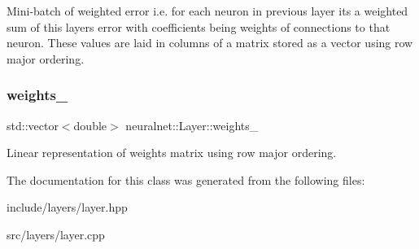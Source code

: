 Mini-\/batch of weighted error i.\+e. for each neuron in previous layer it\textquotesingle{}s a weighted sum of this layer\textquotesingle{}s error with coefficients being weights of connections to that neuron. These values are laid in columns of a matrix stored as a vector using row major ordering. \mbox{\label{classneuralnet_1_1Layer_a6d62e504bac81323fb080a06b2f99341}} 
\subsubsection{\texorpdfstring{weights\+\_\+}{weights\_}}
{\footnotesize\ttfamily std\+::vector$<$double$>$ neuralnet\+::\+Layer\+::weights\+\_\+\hspace{0.3cm}{\ttfamily [protected]}}

Linear representation of weights matrix using row major ordering. 

The documentation for this class was generated from the following files\+:\begin{DoxyCompactItemize}
\item 
include/layers/layer.\+hpp\item 
src/layers/layer.\+cpp\end{DoxyCompactItemize}
